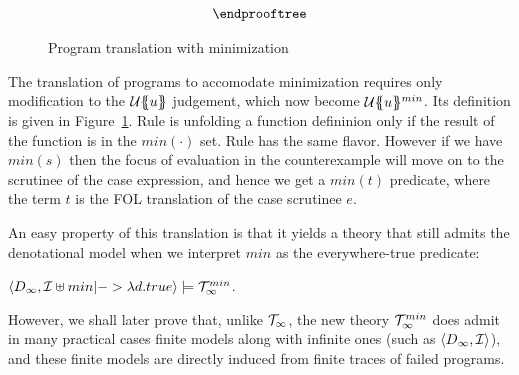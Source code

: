 \begin{figure}
\[\begin{array}{c}
{\begin{array}{l}
  \end{array}}
\endprooftree
\end{array}\]
\caption{Program translation with minimization}\label{fig:min-def-trans-min}
\end{figure}
\newcommand{\ThMin}{\Th_{\infty}^{min}}
\newcommand{\SDownarrow}{\downarrow}

The translation of programs to accomodate minimization requires only modification 
to the ${\cal U}\{\!\!\{u\}\!\!\}$ judgement, which now become ${\cal U}\{\!\!\{u\}\!\!\}^{min}$. Its definition
is given in Figure~\ref{fig:min-def-trans-min}. Rule  is unfolding a function
defininion only if the result of the function is in the $min(\cdot)$ set. Rule 
has the same flavor. However if we have $min(s)$ then the focus of evaluation in the counterexample
will move on to the scrutinee of the case expression, and hence we get a $min(t)$ predicate, where the 
term $t$ is the FOL translation of the case scrutinee $e$.

An easy property of this translation is that it yields a theory that still admits the denotational model 
when we interpret $min$ as the everywhere-true predicate:
\begin{theorem} $\langle D_\infty, {\cal I}\uplus min |-> \lambda d.true\rangle \models \ThMin$. \end{theorem} 

However, we shall later prove that, unlike ${\cal T}_\infty$, the new theory $\ThMin$ does admit in many practical 
cases finite models along with infinite ones (such as $\langle D_{\infty},{\cal I}\rangle$), and these finite 
models are directly induced from finite traces of failed programs.



